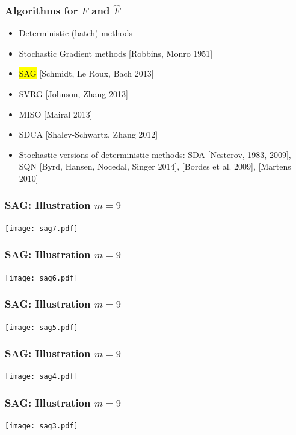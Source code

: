 \documentclass{beamer}
\begin{document}
		\begin{frame}
			\frametitle{Algorithms for $F$ and $\hat{F}$}
			\begin{itemize}
				\item Deterministic (batch) methods
				\item Stochastic Gradient methods [Robbins, Monro 1951] 
				\item \colorbox{yellow}{SAG} [Schmidt, Le Roux, Bach 2013]
				\item SVRG [Johnson, Zhang 2013]
				\item MISO [Mairal 2013]
				\item SDCA [Shalev-Schwartz, Zhang 2012]
				\item Stochastic versions of deterministic methods: SDA [Nesterov, 1983, 2009], SQN [Byrd, Hansen, Nocedal, Singer 2014], [Bordes
et al. 2009], [Martens 2010]
			\end{itemize}
			\end{frame}
		\begin{frame}
			\frametitle{SAG: Illustration $m=9$}
			\begin{center}
					\texttt{[image: sag7.pdf]}
			\end{center}
	    \end{frame}

		\begin{frame}
			\frametitle{SAG: Illustration $m=9$}
			\begin{center}
					\texttt{[image: sag6.pdf]}
			\end{center}
	    \end{frame}

		\begin{frame}
			\frametitle{SAG: Illustration $m=9$}
			\begin{center}
					\texttt{[image: sag5.pdf]}
			\end{center}
	    \end{frame}

		\begin{frame}
			\frametitle{SAG: Illustration $m=9$}
			\begin{center}
					\texttt{[image: sag4.pdf]}
			\end{center}
	    \end{frame}

		\begin{frame}
			\frametitle{SAG: Illustration $m=9$}
			\begin{center}
					\texttt{[image: sag3.pdf]}
			\end{center}
	    \end{frame}
\end{document}

